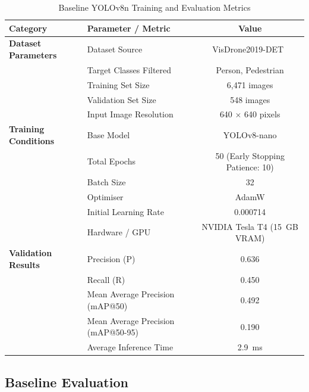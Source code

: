 \documentclass{report_template_oxford}
\begin{document}

\begin{table}[htbp]
    \centering
    \caption{Baseline YOLOv8n Training and Evaluation Metrics}
    \label{tab:visdrone_baseline}
    \begin{tabular}{@{}llc@{}}
        \toprule
        \textbf{Category} & \textbf{Parameter / Metric} & \textbf{Value} \\
        \midrule
        \textbf{Dataset Parameters} & Dataset Source & VisDrone2019-DET~\cite{Zhu2020DetectionAT} \\
        & Target Classes Filtered & Person, Pedestrian \\
        & Training Set Size & 6,471 images \\
        & Validation Set Size & 548 images \\
        & Input Image Resolution & 640 $\times$ 640 pixels \\
        \midrule
        \textbf{Training Conditions} & Base Model & YOLOv8-nano \\
        & Total Epochs & 50 (Early Stopping Patience: 10) \\
        & Batch Size & 32 \\
        & Optimiser & AdamW \\
        & Initial Learning Rate & 0.000714 \\
        & Hardware / GPU & NVIDIA Tesla T4 (15~GB VRAM) \\
        \midrule
        \textbf{Validation Results} & Precision (P) & 0.636 \\
        & Recall (R) & 0.450 \\
        & Mean Average Precision (mAP@50) & 0.492 \\
        & Mean Average Precision (mAP@50-95) & 0.190 \\
        & Average Inference Time & 2.9~ms \\
        \bottomrule
    \end{tabular}
\end{table}

\subsection{Baseline Evaluation}
\end{document}
